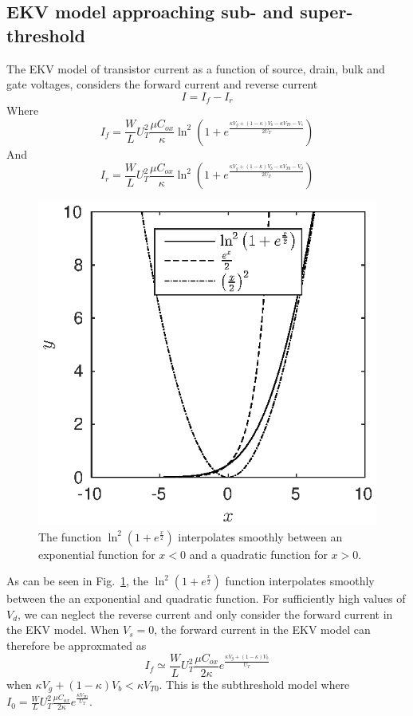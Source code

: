 \subsection{EKV model approaching sub- and super-threshold}
The EKV model of transistor current as a function of source, drain, bulk and gate voltages, considers the
forward current and reverse current
\begin{equation*}
    I = I_f - I_r
\end{equation*}
Where
\begin{equation*}
    I_f = \frac{W}{L}U_T^2\frac{\mu C_{ox}}{\kappa}\ln^2\left(1+e^{\frac{\kappa V_g + (1-\kappa)V_b - \kappa V_{T0} - V_s}{2U_T}}\right)
\end{equation*}
And 
\begin{equation*}
    I_r = \frac{W}{L}U_T^2\frac{\mu C_{ox}}{\kappa}\ln^2\left(1+e^{\frac{\kappa V_g + (1-\kappa)V_b - \kappa V_{T0} - V_d}{2U_T}}\right)
\end{equation*}
\begin{figure}
    \center
    \includegraphics{expquad.eps}
    \caption{The function \(\ln^2\left(1+e^{\frac{x}{2}}\right)\) interpolates smoothly between an exponential function for \(x<0\) and 
    a quadratic function for \(x>0\).}
    \label{fig:expquad}
\end{figure}
As can be seen in Fig.~\ref{fig:expquad}, the \(\ln^2\left(1+e^{\frac{x}{2}}\right)\) function interpolates smoothly between the an exponential and 
quadratic function. For sufficiently high values of \(V_d\), we can neglect the reverse current and only consider the forward current in the 
EKV model. When \(V_s=0\), the forward current in the EKV model can therefore be approxmated as 
\begin{equation*}
    I_f \simeq \frac{W}{L}U_T^2\frac{\mu C_{ox}}{2\kappa}e^{\frac{\kappa V_g +(1-\kappa)V_b}{U_T}}
\end{equation*}
when \(\kappa V_g + (1-\kappa)V_b < \kappa V_{T0}\). This is the subthreshold model where \(I_0 = \frac{W}{L}U_T^2\frac{\mu C_{ox}}{2\kappa}e^{\frac{\kappa V_{T0}}{U_T}}\).

